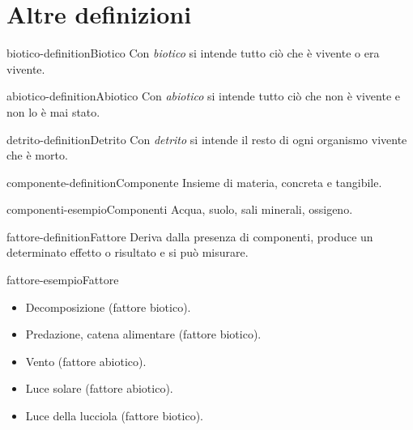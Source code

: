 \documentclass[preview]{standalone}
\begin{document}
\section{Altre definizioni}

\begin{snippetdefinition}{biotico-definition}{Biotico}
    Con \textit{biotico} si intende tutto ciò che è vivente o era vivente.
\end{snippetdefinition}

\begin{snippetdefinition}{abiotico-definition}{Abiotico}
    Con \textit{abiotico} si intende tutto ciò che non è vivente e non lo è mai stato.
\end{snippetdefinition}

\begin{snippetdefinition}{detrito-definition}{Detrito}
    Con \textit{detrito} si intende il resto di ogni organismo vivente che è morto.
\end{snippetdefinition}


\begin{snippetdefinition}{componente-definition}{Componente}
    Insieme di materia, concreta e tangibile.
\end{snippetdefinition}

\begin{snippetexample}{componenti-esempio}{Componenti}
    Acqua, suolo, sali minerali, ossigeno.
\end{snippetexample}

\begin{snippetdefinition}{fattore-definition}{Fattore}
    Deriva dalla presenza di componenti, produce un determinato effetto o risultato e si può misurare.
\end{snippetdefinition}

\begin{snippetexample}{fattore-esempio}{Fattore}
    \begin{itemize}
        \item Decomposizione (fattore biotico).
        \item Predazione, catena alimentare (fattore biotico).
        \item Vento (fattore abiotico).
        \item Luce solare (fattore abiotico).
        \item Luce della lucciola (fattore biotico).
    \end{itemize}
\end{snippetexample}
\end{document}
